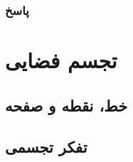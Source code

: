 \documentclass[12pt, a4paper]{book}
\begin{document}
\newpage

\subsection{پاسخ}
\chapter{تجسم فضایی}

\section{خط، نقطه و صفحه}

\section{تفکر تجسمی}
	
\end{document}
